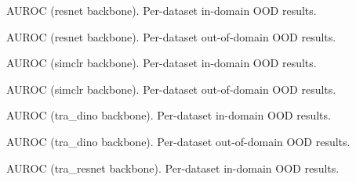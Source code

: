 \documentclass[runningheads]{llncs}
\begin{document}
\begin{table}[htbp]
  \centering
  \caption{AUROC (resnet backbone). Per-dataset in-domain OOD results.}
  \label{tab:supp:extended:auroc:resnet:in}
  \small
  \resizebox{\linewidth}{!}{}
\end{table}

\begin{table}[htbp]
  \centering
  \caption{AUROC (resnet backbone). Per-dataset out-of-domain OOD results.}
  \label{tab:supp:extended:auroc:resnet:out}
  \small
  \resizebox{\linewidth}{!}{}
\end{table}

\begin{table}[htbp]
  \centering
  \caption{AUROC (simclr backbone). Per-dataset in-domain OOD results.}
  \label{tab:supp:extended:auroc:simclr:in}
  \small
  \resizebox{\linewidth}{!}{}
\end{table}

\begin{table}[htbp]
  \centering
  \caption{AUROC (simclr backbone). Per-dataset out-of-domain OOD results.}
  \label{tab:supp:extended:auroc:simclr:out}
  \small
  \resizebox{\linewidth}{!}{}
\end{table}

\begin{table}[htbp]
  \centering
  \caption{AUROC (tra\_dino backbone). Per-dataset in-domain OOD results.}
  \label{tab:supp:extended:auroc:tra_dino:in}
  \small
  \resizebox{\linewidth}{!}{}
\end{table}

\begin{table}[htbp]
  \centering
  \caption{AUROC (tra\_dino backbone). Per-dataset out-of-domain OOD results.}
  \label{tab:supp:extended:auroc:tra_dino:out}
  \small
  \resizebox{\linewidth}{!}{}
\end{table}

\begin{table}[htbp]
  \centering
  \caption{AUROC (tra\_resnet backbone). Per-dataset in-domain OOD results.}
  \label{tab:supp:extended:auroc:tra_resnet:in}
  \small
  \resizebox{\linewidth}{!}{}
\end{table}
\end{document}
